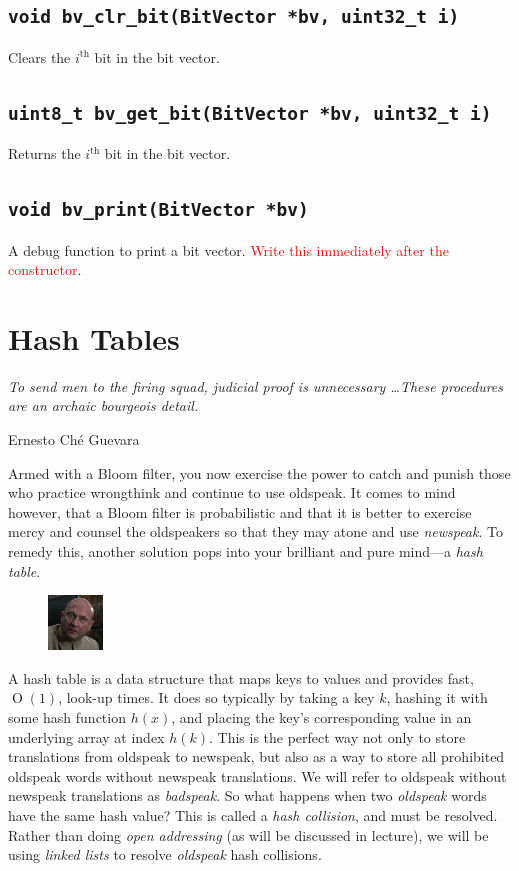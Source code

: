 \documentclass{article}
\begin{document}
\subsection{\texttt{void bv\_clr\_bit(BitVector *bv, uint32\_t i)}}

Clears the $i^\text{th}$ bit in the bit vector.

\subsection{\texttt{uint8\_t bv\_get\_bit(BitVector *bv, uint32\_t i)}}

Returns the $i^\text{th}$ bit in the bit vector.

\subsection{\texttt{void bv\_print(BitVector *bv)}}

A debug function to print a bit vector. \textcolor{red}{Write this
immediately after the constructor}.


\section{Hash Tables}

\epigraph{\emph{To send men to the firing squad, judicial proof is
unnecessary \ldots These procedures are an archaic bourgeois
detail.}}{Ernesto Ch\'e Guevara}

\noindent Armed with a Bloom filter, you now exercise the power to catch and
punish those who practice wrongthink and continue to use oldspeak. It
comes to mind however, that a Bloom filter is probabilistic and that it
is better to exercise mercy and counsel the oldspeakers so that they may
atone and use \emph{newspeak}. To remedy this, another solution pops
into your brilliant and pure mind---a \emph{hash table}.

\begin{figure}
\centering
\includegraphics[width=0.130\textwidth]{images/Blofeld.png}
\end{figure}

A hash table is a data structure that maps keys to values and provides
fast, $\operatorname{O}(1)$, look-up times. It does so typically by
taking a key $k$, hashing it with some hash function $h(x)$, and placing
the key's corresponding value in an underlying array at index $h(k)$.
This is the perfect way not only to store translations from oldspeak to
newspeak, but also as a way to store all prohibited oldspeak words
without newspeak translations. We will refer to oldspeak without
newspeak translations as \emph{badspeak}. So what happens when two
\emph{oldspeak} words have the same hash value?  This is called a
\emph{hash collision}, and must be resolved. Rather than doing
\emph{open addressing} (as will be discussed in lecture), we will be
using \emph{linked lists} to resolve \emph{oldspeak} hash collisions.
\end{document}
